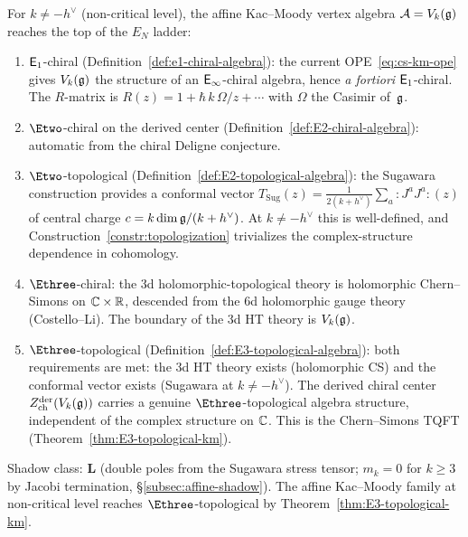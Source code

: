 \begin{remark}
\label{rem:km-EN-level}
For $k \ne -h^\vee$ (non-critical level), the affine
Kac--Moody vertex algebra $\mathcal{A} = V_k(\mathfrak{g})$ reaches the
top of the $E_N$ ladder:
\begin{enumerate}[label=\textup{(\roman*)}]
\item $\mathsf{E}_1$-chiral
 (Definition~\ref{def:e1-chiral-algebra}): the current
 OPE~\eqref{eq:cs-km-ope} gives $V_k(\mathfrak{g})$ the
 structure of an $\mathsf{E}_{\infty}$-chiral algebra, hence
 \emph{a fortiori} $\mathsf{E}_1$-chiral.
 The $R$-matrix is $R(z) = 1 + \hbar\,k\,\Omega/z + \cdots$
 with $\Omega$ the Casimir of~$\mathfrak{g}$.

\item $\Etwo$-chiral on the derived center
 (Definition~\ref{def:E2-chiral-algebra}): automatic from
 the chiral Deligne conjecture.

\item $\Etwo$-topological
 (Definition~\ref{def:E2-topological-algebra}): the
 Sugawara construction provides a conformal vector
 $T_{\mathrm{Sug}}(z)
 = \frac{1}{2(k + h^\vee)}
 \sum_a {:}\!J^a J^a\!{:}(z)$
 of central charge $c = k\dim\mathfrak{g}/(k + h^\vee)$.
 At $k \ne -h^\vee$ this is well-defined, and
 Construction~\ref{constr:topologization} trivializes the
 complex-structure dependence in cohomology.

\item $\Ethree$-chiral: the 3d holomorphic-topological
 theory is holomorphic Chern--Simons on $\mathbb{C} \times \mathbb{R}$,
 descended from the 6d holomorphic gauge theory
 (Costello--Li). The boundary of the 3d HT theory is
 $V_k(\mathfrak{g})$.

\item $\Ethree$-topological
 (Definition~\ref{def:E3-topological-algebra}): both
 requirements are met: the 3d HT theory exists
 (holomorphic CS) and the conformal vector exists
 (Sugawara at $k \ne -h^\vee$). The derived chiral
 center $Z^{\mathrm{der}}_{\mathrm{ch}}(V_k(\mathfrak{g}))$
 carries a genuine $\Ethree$-topological algebra
 structure, independent of the complex structure on
 $\mathbb{C}$. This is the Chern--Simons TQFT
 \textup{(}Theorem~\ref{thm:E3-topological-km}\textup{)}.
\end{enumerate}
Shadow class: $\mathbf{L}$ (double poles from the
Sugawara stress tensor; $m_k = 0$ for $k \ge 3$ by
Jacobi termination, \S\ref{subsec:affine-shadow}).
The affine Kac--Moody family at non-critical level reaches
$\Ethree$-topological by
Theorem~\ref{thm:E3-topological-km}.
\end{remark}

